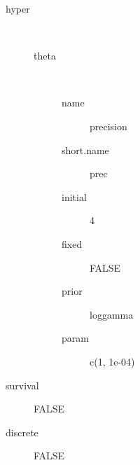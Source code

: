 \begin{description}
	\item[hyper]\ 
	 \begin{description}
	 	\item[theta]\ 
	 	 \begin{description}
	 	 	 \item[ name ] precision 
	 	 	 \item[ short.name ] prec 
	 	 	 \item[ initial ] 4 
	 	 	 \item[ fixed ] FALSE 
	 	 	 \item[ prior ] loggamma 
	 	 	 \item[ param ] c(1, 1e-04) 
	 	 \end{description}
	 \end{description}
	 \item[ survival ] FALSE 
	 \item[ discrete ] FALSE 
\end{description}
